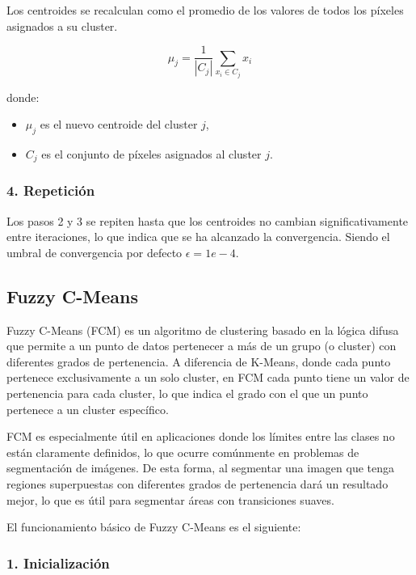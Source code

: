 Los centroides se recalculan como el promedio de los valores de todos los píxeles asignados a su cluster.

$$\mu_j =\frac{1}{|C_j |}\sum_{x_i \in C_j } x_i$$

donde:

\begin{itemize}
\setlength{\itemsep}{-1ex}
   \item{\begin{flushleft} $\mu_j$ es el nuevo centroide del cluster $j$, \end{flushleft}}
   \item{\begin{flushleft} $C_j$ es el conjunto de píxeles asignados al cluster $j$. \end{flushleft}}
\end{itemize}

\subsubsection{4. Repetición}

Los pasos 2 y 3 se repiten hasta que los centroides no cambian significativamente entre iteraciones, lo que indica que se ha alcanzado la convergencia. Siendo el umbral de convergencia por defecto $\epsilon =1e-4$.

\subsection{Fuzzy C-Means}\label{fuzzy-c-means}
Fuzzy C-Means (FCM) \cite{MATLAB:2023bFuzzy} es un algoritmo de clustering basado en la lógica difusa que permite a un punto de datos pertenecer a más de un grupo (o cluster) con diferentes grados de pertenencia. A diferencia de K-Means, donde cada punto pertenece exclusivamente a un solo cluster, en FCM cada punto tiene un valor de pertenencia para cada cluster, lo que indica el grado con el que un punto pertenece a un cluster específico.

FCM es especialmente útil en aplicaciones donde los límites entre las clases no están claramente definidos, lo que ocurre comúnmente en problemas de segmentación de imágenes. De esta forma, al segmentar una imagen que tenga regiones superpuestas con diferentes grados de pertenencia dará un resultado mejor, lo que es útil para segmentar áreas con transiciones suaves.

El funcionamiento básico de Fuzzy C-Means es el siguiente:

\subsubsection{1. Inicialización}

